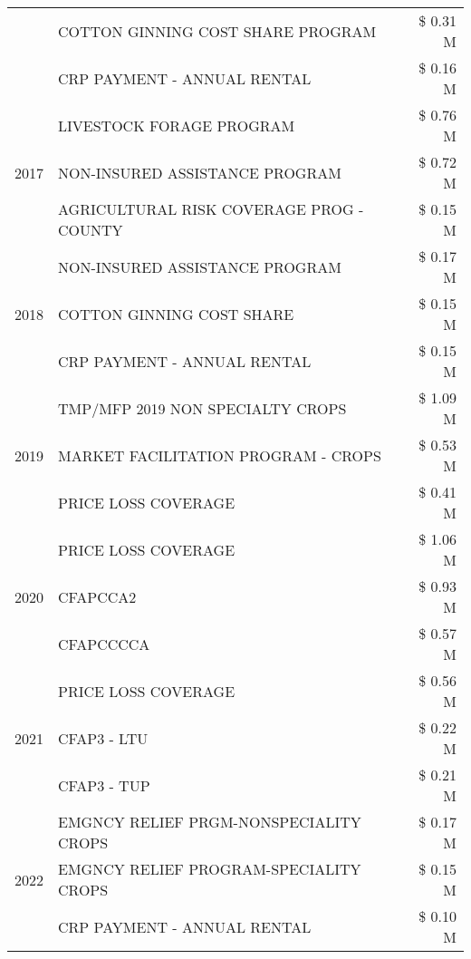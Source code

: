 \begin{tabular}{llr}
 & COTTON GINNING COST SHARE PROGRAM & \$ 0.31 M \\
 & CRP PAYMENT - ANNUAL RENTAL & \$ 0.16 M \\
\cline{1-3}
\multirow[t]{3}{*}{2017} & LIVESTOCK FORAGE PROGRAM & \$ 0.76 M \\
 & NON-INSURED ASSISTANCE PROGRAM & \$ 0.72 M \\
 & AGRICULTURAL RISK COVERAGE PROG - COUNTY & \$ 0.15 M \\
\cline{1-3}
\multirow[t]{3}{*}{2018} & NON-INSURED ASSISTANCE PROGRAM & \$ 0.17 M \\
 & COTTON GINNING COST SHARE & \$ 0.15 M \\
 & CRP PAYMENT - ANNUAL RENTAL & \$ 0.15 M \\
\cline{1-3}
\multirow[t]{3}{*}{2019} & TMP/MFP 2019 NON SPECIALTY CROPS & \$ 1.09 M \\
 & MARKET FACILITATION PROGRAM - CROPS & \$ 0.53 M \\
 & PRICE LOSS COVERAGE & \$ 0.41 M \\
\cline{1-3}
\multirow[t]{3}{*}{2020} & PRICE LOSS COVERAGE & \$ 1.06 M \\
 & CFAPCCA2 & \$ 0.93 M \\
 & CFAPCCCCA & \$ 0.57 M \\
\cline{1-3}
\multirow[t]{3}{*}{2021} & PRICE LOSS COVERAGE & \$ 0.56 M \\
 & CFAP3 - LTU & \$ 0.22 M \\
 & CFAP3 - TUP & \$ 0.21 M \\
\cline{1-3}
\multirow[t]{3}{*}{2022} & EMGNCY RELIEF PRGM-NONSPECIALITY CROPS & \$ 0.17 M \\
 & EMGNCY RELIEF PROGRAM-SPECIALITY CROPS & \$ 0.15 M \\
 & CRP PAYMENT - ANNUAL RENTAL & \$ 0.10 M \\
\cline{1-3}
\bottomrule
\end{tabular}
